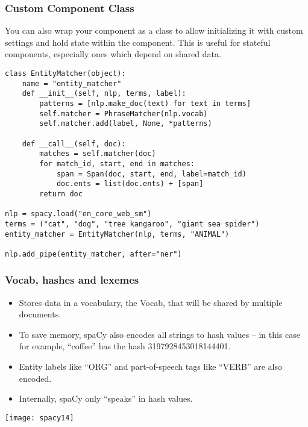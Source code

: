 \begin{frame}[fragile]\frametitle{Custom Component Class}
You can also wrap your component as a class to allow initializing it with custom settings and hold state within the component. This is useful for stateful components, especially ones which depend on shared data.
		\begin{lstlisting}
class EntityMatcher(object):
    name = "entity_matcher"
    def __init__(self, nlp, terms, label):
        patterns = [nlp.make_doc(text) for text in terms]
        self.matcher = PhraseMatcher(nlp.vocab)
        self.matcher.add(label, None, *patterns)

    def __call__(self, doc):
        matches = self.matcher(doc)
        for match_id, start, end in matches:
            span = Span(doc, start, end, label=match_id)
            doc.ents = list(doc.ents) + [span]
        return doc

nlp = spacy.load("en_core_web_sm")
terms = ("cat", "dog", "tree kangaroo", "giant sea spider")
entity_matcher = EntityMatcher(nlp, terms, "ANIMAL")

nlp.add_pipe(entity_matcher, after="ner")
\end{lstlisting}	
	
\end{frame}

\begin{frame}[fragile]\frametitle{Vocab, hashes and lexemes}
  \begin{itemize}
    \item Stores data in a vocabulary, the Vocab, that will be shared by multiple documents. 
		\item To save memory, spaCy also encodes all strings to hash values – in this case for example, “coffee” has the hash 3197928453018144401. 
		\item Entity labels like “ORG” and part-of-speech tags like “VERB” are also encoded. 
		\item Internally, spaCy only “speaks” in hash values.
  \end{itemize}
	
	\begin{center}
\texttt{[image: spacy14]}
\end{center}
	
\end{frame}

